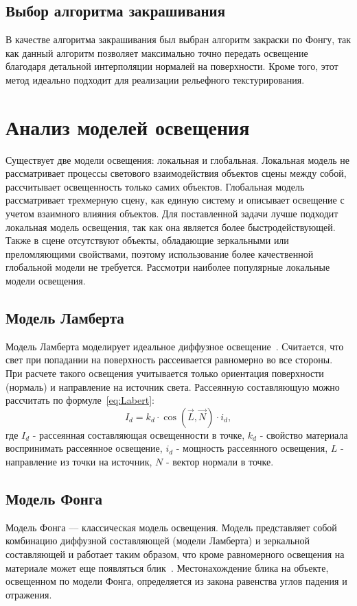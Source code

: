 \subsection{Выбор алгоритма закрашивания}
В качестве алгоритма закрашивания был выбран алгоритм закраски по Фонгу, так как данный алгоритм позволяет максимально точно передать освещение благодаря детальной интерполяции нормалей на поверхности. Кроме того, этот метод идеально подходит для реализации рельефного текстурирования.

\section{Анализ моделей освещения}
Существует две модели освещения: локальная и глобальная. Локальная модель не рассматривает процессы светового взаимодействия объектов сцены между собой, рассчитывает освещенность только самих объектов. Глобальная модель рассматривает трехмерную сцену, как единую систему и описывает освещение с учетом взаимного влияния объектов.
Для поставленной задачи лучше подходит локальная модель освещения, так как она является более быстродействующей. Также в сцене отсутствуют объекты, обладающие зеркальными или преломляющими свойствами, поэтому использование более качественной глобальной модели не требуется.
Рассмотри наиболее популярные локальные модели освещения.

\subsection{Модель Ламберта}
Модель Ламберта моделирует идеальное диффузное освещение~\cite{Освещение}. Считается, что свет при попадании на поверхность рассеивается равномерно во все стороны. При расчете такого освещения учитывается только ориентация поверхности (нормаль) и направление на источник света. 
Рассеянную составляющую можно рассчитать по формуле~\ref{eq:Labert}:
\begin{equation}
    \label{eq:Labert}
    I_d = k_d \cdot \cos(\vec{L},\vec{N}) \cdot i_d,
\end{equation}
где $I_d$ - рассеянная составляющая освещенности в точке, $k_d$ - свойство материала воспринимать рассеянное освещение, $i_d$ - мощность рассеянного освещения, $L$ - направление из точки на источник, $N$ - вектор нормали в точке.

\subsection{Модель Фонга}
Модель Фонга –-- классическая модель освещения. Модель представляет собой комбинацию диффузной составляющей (модели Ламберта) и зеркальной составляющей и работает таким образом, что кроме равномерного освещения на материале может еще появляться блик~\cite{Освещение}. Местонахождение блика на объекте, освещенном по модели Фонга, определяется из закона равенства углов падения и отражения.

